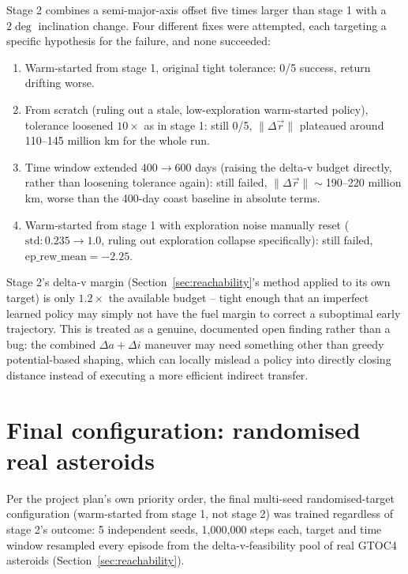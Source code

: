Stage 2 combines a semi-major-axis offset five times larger than stage 1 with a $2\deg$
inclination change. Four different fixes were attempted, each targeting a specific hypothesis for
the failure, and none succeeded:
\begin{enumerate}
  \item Warm-started from stage 1, original tight tolerance: 0/5 success, return drifting worse.
  \item From scratch (ruling out a stale, low-exploration warm-started policy), tolerance
        loosened $10\times$ as in stage 1: still 0/5, $\lVert\Delta\vec r\rVert$ plateaued around
        110--145 million km for the whole run.
  \item Time window extended 400$\to$600 days (raising the delta-v budget directly, rather than
        loosening tolerance again): still failed,
        $\lVert\Delta\vec r\rVert\sim$190--220 million km, worse than the 400-day coast baseline
        in absolute terms.
  \item Warm-started from stage 1 with exploration noise manually reset
        ($\mathrm{std}: 0.235\to1.0$, ruling out exploration collapse specifically): still failed,
        $\mathrm{ep\_rew\_mean}=-2.25$.
\end{enumerate}
Stage 2's delta-v margin (Section~\ref{sec:reachability}'s method applied to its own target) is
only $1.2\times$ the available budget -- tight enough that an imperfect learned policy may simply
not have the fuel margin to correct a suboptimal early trajectory. This is treated as a genuine,
documented open finding rather than a bug: the combined $\Delta a + \Delta i$ maneuver may need
something other than greedy potential-based shaping, which can locally mislead a policy into
directly closing distance instead of executing a more efficient indirect transfer.

\section{Final configuration: randomised real asteroids}
\label{sec:results-final}

Per the project plan's own priority order, the final multi-seed randomised-target configuration
(warm-started from stage 1, not stage 2) was trained regardless of stage 2's outcome: 5
independent seeds, 1{,}000{,}000 steps each, target and time window resampled every episode from
the delta-v-feasibility pool of real GTOC4 asteroids (Section~\ref{sec:reachability}).

